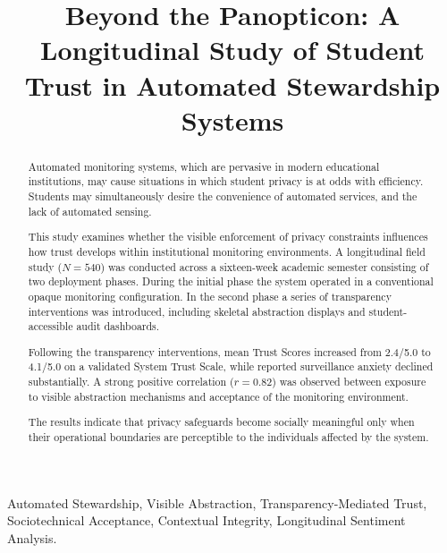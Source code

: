 \documentclass[conference]{IEEEtran}
\begin{document}
\title{Beyond the Panopticon: A Longitudinal Study of Student Trust in Automated Stewardship Systems}

\author{
}

\maketitle

\begin{abstract}
Automated monitoring systems, which are pervasive in modern educational institutions, may cause situations in which student privacy is at odds with efficiency. Students may simultaneously desire the convenience of automated services, and the lack of automated sensing.

This study examines whether the visible enforcement of privacy constraints influences how trust develops within institutional monitoring environments. A longitudinal field study ($N = 540$) was conducted across a sixteen-week academic semester consisting of two deployment phases. During the initial phase the system operated in a conventional opaque monitoring configuration. In the second phase a series of transparency interventions was introduced, including skeletal abstraction displays and student-accessible audit dashboards.

Following the transparency interventions, mean Trust Scores increased from 2.4/5.0 to 4.1/5.0 on a validated System Trust Scale, while reported surveillance anxiety declined substantially. A strong positive correlation ($r = 0.82$) was observed between exposure to visible abstraction mechanisms and acceptance of the monitoring environment.

The results indicate that privacy safeguards become socially meaningful only when their operational boundaries are perceptible to the individuals affected by the system.
\end{abstract}

\begin{IEEEkeywords}
Automated Stewardship, Visible Abstraction, Transparency-Mediated Trust, Sociotechnical Acceptance, Contextual Integrity, Longitudinal Sentiment Analysis.
\end{IEEEkeywords}
\end{document}
